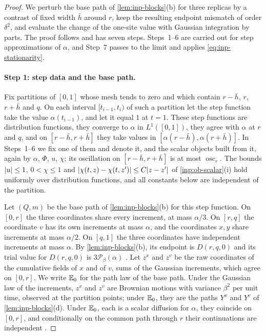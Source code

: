 \begin{proof}
We perturb the base path of \cref{lem:inp-blocks}(b) for three replicas by a contrast of fixed width $\bar h$ around $r$, keep the resulting endpoint mismatch of order $\delta^2$, and evaluate the change of the one-site value with Gaussian integration by parts. The proof follows \cite[Section~7, Steps~1--7]{oai-barriers} and has seven steps. Steps~1--6 are carried out for step approximations of $\alpha$, and Step~7 passes to the limit and applies \eqref{eq:inp-stationarity}.

\paragraph{Step 1: step data and the base path.} Fix partitions of $[0,1]$ whose mesh tends to zero and which contain $r-\bar h$, $r$, $r+\bar h$ and $q$. On each interval $[t_{i-1},t_i)$ of such a partition let the step function take the value $\alpha(t_{i-1})$, and let it equal $1$ at $t=1$. These step functions are distribution functions, they converge to $\alpha$ in $L^1([0,1])$, they agree with $\alpha$ at $r$ and $q$, and on $[r-\bar h,r+\bar h]$ they take values in $[\alpha(r-\bar h),\alpha(r+\bar h)]$. In Steps~1--6 we fix one of them and denote it, and the scalar objects built from it, again by $\alpha$, $\Phi$, $u$, $\chi$; its oscillation on $[r-\bar h,r+\bar h]$ is at most $\operatorname{osc}_r$. The bounds $\lvert u\rvert\le1$, $0<\chi\le1$ and $\lvert \chi(t,z)-\chi(t,z')\rvert\le C\lvert z-z'\rvert$ of \cref{inp:ob-scalar}(i) hold uniformly over distribution functions, and all constants below are independent of the partition.

Let $(Q,m)$ be the base path of \cref{lem:inp-blocks}(b) for this step function. On $[0,r]$ the three coordinates share every increment, at mass $\alpha/3$. On $[r,q]$ the coordinate $v$ has its own increments at mass $\alpha$, and the coordinates $x,y$ share increments at mass $\alpha/2$. On $[q,1]$ the three coordinates have independent increments at mass $\alpha$. By \cref{lem:inp-blocks}(b), its endpoint is $D(r,q,0)$ and its trial value for $D(r,q,0)$ is $3\mathcal P_\beta(\alpha)$ \cite[(7.7)]{oai-barriers}. Let $z^x$ and $z^v$ be the raw coordinates of the cumulative fields of $x$ and of $v$, sums of the Gaussian increments, which agree on $[0,r]$. We write $\mathbb E_0$ for the path law of the base path. Under the Gaussian law of the increments, $z^x$ and $z^v$ are Brownian motions with variance $\beta^2$ per unit time, observed at the partition points; under $\mathbb E_0$, they are the paths $Y^x$ and $Y^v$ of \cref{lem:inp-blocks}(d). Under $\mathbb E_0$, each is a scalar diffusion for $\alpha$, they coincide on $[0,r]$, and conditionally on the common path through $r$ their continuations are independent \cite[(4.6)]{oai-barriers}.


\end{proof}

